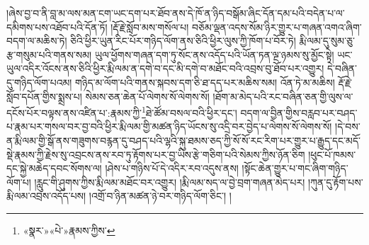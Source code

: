 །ཞེས་བྱ་བ་ནི་བླ་མ་ལས་མན་ངག་ཡང་དག་པར་ཐོབ་ནས་དེ་ཁོ་ན་ཉིད་བསྒོམ་ཞིང་དོན་དམ་པའི་བདེན་པ་ལ་དམིགས་པས་འཐོབ་པའི་དོན་ཏོ། །རྡོ་རྗེ་སློབ་མས་གསོལ་པ། བཅོམ་ལྡན་འདས་སོམ་ཉིར་གྱུར་པ་གཞན་འགའ་ཞིག་བདག་ལ་མཆིས་ཏེ། ཅིའི་ཕྱིར་ཡུན་རིང་པོར་གཉིད་ལོག་ནས་ཅིའི་ཕྱིར་ལུས་ཀྱི་ཁོག་པ་བོར་ཏེ། རྨི་ལམ་དུ་སུམ་ཅུ་རྩ་གསུམ་པའི་གནས་སམ། ཡུལ་ཕྱོགས་གཞན་དག་ཏུ་སོང་ནས་འདོད་པའི་ཡོན་ཏན་ལྔ་ཉམས་སུ་མྱོང་སྟེ། ཡང་ཡུལ་འདིར་འོངས་ནས་ཅིའི་ཕྱིར་རྨི་ལམ་ན་དགེ་བ་དང་མི་དགེ་བ་མཐོང་བའི་འབྲས་བུ་ཐོབ་པར་འགྱུར། དེ་བཞིན་དུ་གཉིད་ལོག་པའམ། གཉིད་མ་ལོག་པའི་གནས་སྐབས་དག་ཅི་ཐ་དད་པར་མཆིས་སམ། འོན་ཏེ་མ་མཆིས། རྡོ་རྗེ་སློབ་དཔོན་གྱིས་སྨྲས་པ། སེམས་ཅན་ཆེན་པོ་ལེགས་སོ་ལེགས་སོ། །ཐོག་མ་མེད་པའི་རང་བཞིན་ཅན་གྱི་ལུས་ལ་དངོས་པོར་བལྟས་ནས་འཛིན་པ་:རྣམས་ཀྱི་\footnote{«སྣར་»«པེ་»རྣམས་ཀྱིས་}ཐེ་ཚོམ་བསལ་བའི་ཕྱིར་དང་། བདག་ལ་བྱིན་གྱིས་བརླབ་པར་བཤད་པ་རྣམ་པར་གསལ་བར་བྱ་བའི་ཕྱིར་རྨི་ལམ་གྱི་མཚན་ཉིད་ཡོངས་སུ་འདྲི་བར་བྱེད་པ་ལེགས་སོ་ལེགས་སོ། །དེ་བས་ན་རྨི་ལམ་གྱི་སྒོ་ནས་གཟུགས་བརྙན་དུ་བཤད་པའི་ལྷའི་སྐུ་ཐམས་ཅད་ཀྱི་སོ་སོ་རང་རིག་པར་གྱུར་པ་རྒྱུད་དང་མདོ་སྡེ་རྣམས་ཀྱི་རྗེས་སུ་འབྲངས་ནས་རབ་ཏུ་རྟོགས་པར་བྱ་ཡིས་རྩེ་གཅིག་པའི་སེམས་ཀྱིས་ཉོན་ཅིག །ཕུང་པོ་ཁམས་དང་སྐྱེ་མཆེད་དབང་སོགས་ལ། །ཤེས་པ་གཉིས་པོ་དེ་འདིར་རབ་འདུས་ནས། །སྟོང་ཆེན་གྱུར་པ་གང་ཞིག་གཉིད་ལོག་པ། །རླུང་གི་ཤུགས་ཀྱིས་རྨི་ལམ་མཐོང་བར་འགྱུར། །རྨི་ལམ་སད་ལ་བྱེ་བྲག་གཞན་མེད་པར། །ཀུན་དུ་རྟོག་པས་རྨི་ལམ་འབྲས་འདོད་པས། །འགྲོ་བ་ཉིན་མཚན་ཉེ་བར་གཉིད་ལོག་ཅིང་། །
